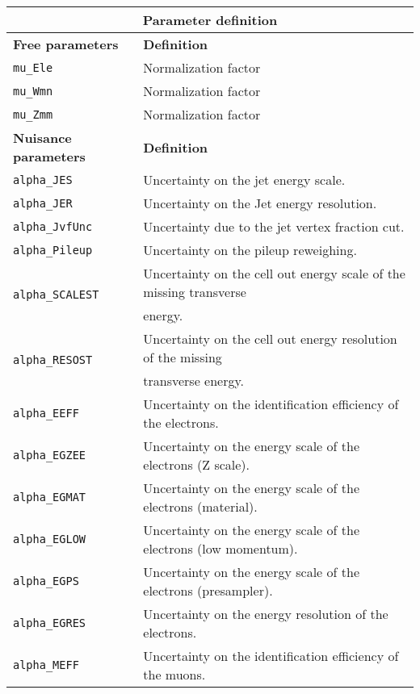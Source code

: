 \begin{table}
\begin{center}
\begin{scriptsize}
\begin{tabular}{|l|l|}
\hline
\multicolumn{2}{|c|}{{\bf Parameter definition}} \\ \hline
{\bf Free parameters} & {\bf Definition}            \\
\hline
\texttt{mu\_Ele}             & Normalization factor \\ 
\texttt{mu\_Wmn}             & Normalization factor \\ 
\texttt{mu\_Zmm}             & Normalization factor \\ \hline \hline
{\bf Nuisance parameters} & {\bf Definition}           \\ 
\texttt{alpha\_JES   }       & Uncertainty on the jet energy scale. \\ 
\texttt{alpha\_JER   }       & Uncertainty on the Jet energy resolution. \\ 
\texttt{alpha\_JvfUnc}       & Uncertainty due to the jet vertex fraction cut. \\ 
\texttt{alpha\_Pileup}       & Uncertainty on the pileup reweighing. \\ 
\multirow{2}{*}{\texttt{alpha\_SCALEST}}      & Uncertainty on the cell out energy scale of the missing transverse \\
                    & energy. \\ 
\multirow{2}{*}{\texttt{alpha\_RESOST}}       & Uncertainty on the cell out energy resolution of the missing \\
                    & transverse energy. \\ 
\texttt{alpha\_EEFF  }       & Uncertainty on the identification efficiency of the electrons. \\ 
\texttt{alpha\_EGZEE }       & Uncertainty on the energy scale of the electrons (Z scale). \\ 
\texttt{alpha\_EGMAT }       & Uncertainty on the energy scale of the electrons (material). \\ 
\texttt{alpha\_EGLOW }       & Uncertainty on the energy scale of the electrons (low momentum). \\ 
\texttt{alpha\_EGPS  }       & Uncertainty on the energy scale of the electrons (presampler). \\ 
\texttt{alpha\_EGRES }       & Uncertainty on the energy resolution of the electrons. \\ 
\texttt{alpha\_MEFF  }       & Uncertainty on the identification efficiency of the muons.\\ 

\end{tabular}
\end{scriptsize}
\end{center}
\end{table}
